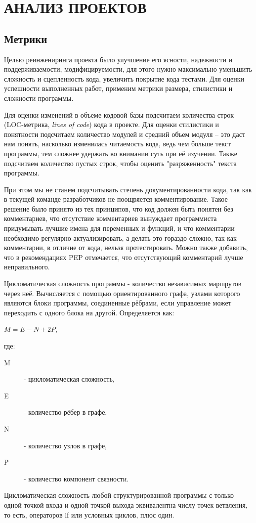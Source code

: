 \section{АНАЛИЗ ПРОЕКТОВ}
    \subsection{Метрики}
    Целью реинжениринга проекта было улучшение его ясности, надежности и поддерживаемости,
    модифицируемости, для этого нужно максимально уменьшить сложность и сцепленность кода,
    увеличить покрытие кода тестами.
    Для оценки успешности выполненных работ, применим метрики размера,
    стилистики и сложности программы.
    \cite{clearcode.habr}

    Для оценки изменений в объеме кодовой базы подсчитаем количества строк
    (LOC-метрика, \textit{lines of code}) кода в проекте.
    Для оценки стилистики и понятности подсчитаем количество модулей и средний
    объем модуля -- это даст нам понять, насколько изменилась читаемость кода,
    ведь чем больше текст программы, тем сложнее удержать во внимании суть при 
    её изучении. Также подсчитаем количество пустых строк, чтобы оценить
    "разряженность" текста программы.

    При этом мы не станем подсчитывать степень документированности кода,
    так как в текущей команде разработчиков не поощряется комментирование.
    Такое решение было принято из тех принципов, что код должен быть понятен без
    комментариев, что отсутствие комментариев вынуждает программиста придумывать
    лучшие имена для переменных и функций,
    и что комментарии необходимо регулярно актуализировать, а делать это
    гораздо сложно, так как комментарии, в отличие от кода, нельзя
    протестировать.
    Можно также добавить, что в рекомендациях PEP отмечается, что отсутствующий
    комментарий лучше неправильного.

    Цикломатическая сложность программы - количество независимых маршрутов через
    неё. Вычисляется с помощью ориентированного графа, узлами которого являются
    блоки программы, соединенные рёбрами, если управление может переходить с
    одного блока на другой. Определяется как:
    \begin{center}
        $ M = E - N + 2P $, 
    \end{center}
    где:
    \begin{description}
        \item [M] - цикломатическая сложность,
        \item [E] - количество рёбер в графе,
        \item [N] - количество узлов в графе,
        \item [P] - количество компонент связности.
    \end{description}
    Цикломатическая сложность любой структурированной программы с только одной
    точкой входа и одной точкой выхода эквивалентна числу точек ветвления,
    то есть, операторов if или условных циклов, плюс один.
    \cite{complexity.McCabe}

